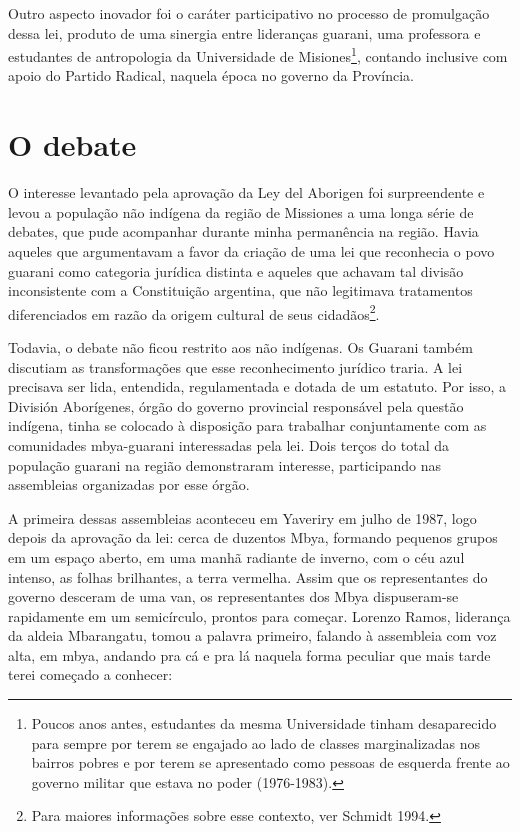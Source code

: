 Outro aspecto inovador foi o caráter participativo no processo de
promulgação dessa lei, produto de uma sinergia entre lideranças
guarani, uma professora e estudantes de antropologia da Universidade de
Misiones\footnote{Poucos anos antes, estudantes da mesma Universidade
tinham desaparecido para sempre por terem se engajado ao lado de
classes marginalizadas nos bairros pobres e por terem se apresentado
como pessoas de esquerda frente ao governo militar que estava no poder
(1976-1983).}, contando inclusive com apoio do Partido Radical, naquela
época no governo da Província. 

\section{O debate}

O interesse levantado pela aprovação da Ley del Aborigen foi
surpreendente e levou a população não indígena da região de Missiones a
uma longa série de debates, que pude acompanhar durante minha
permanência na região. Havia aqueles que argumentavam a favor da
criação de uma lei que reconhecia o povo guarani como categoria
jurídica distinta e aqueles que achavam tal divisão inconsistente com a
Constituição argentina, que não legitimava tratamentos diferenciados em
razão da origem cultural de seus cidadãos\footnote{Para maiores
informações sobre esse contexto, ver Schmidt 1994.}. 

Todavia, o debate não ficou restrito aos não indígenas. Os Guarani
também discutiam as transformações que esse reconhecimento jurídico
traria. A lei precisava ser lida, entendida, regulamentada e dotada de
um estatuto. Por isso, a División Aborígenes, órgão do governo
provincial responsável pela questão indígena, tinha se colocado à
disposição para trabalhar conjuntamente com as comunidades mbya-guarani
interessadas pela lei. Dois terços do total da população guarani na
região demonstraram interesse, participando nas assembleias organizadas
por esse órgão. 

A primeira dessas assembleias aconteceu em Yaveriry em julho de 1987,
logo depois da aprovação da lei: cerca de duzentos Mbya, formando
pequenos grupos em um espaço aberto, em uma manhã radiante de inverno,
com o céu azul intenso, as folhas brilhantes, a terra vermelha. Assim
que os representantes do governo desceram de uma van, os representantes
dos Mbya dispuseram-se rapidamente em um semicírculo, prontos para
começar. Lorenzo Ramos, liderança da aldeia Mbarangatu, tomou a palavra
primeiro, falando à assembleia com voz alta, em mbya, andando pra cá e
pra lá naquela forma peculiar que mais tarde terei começado a conhecer:

